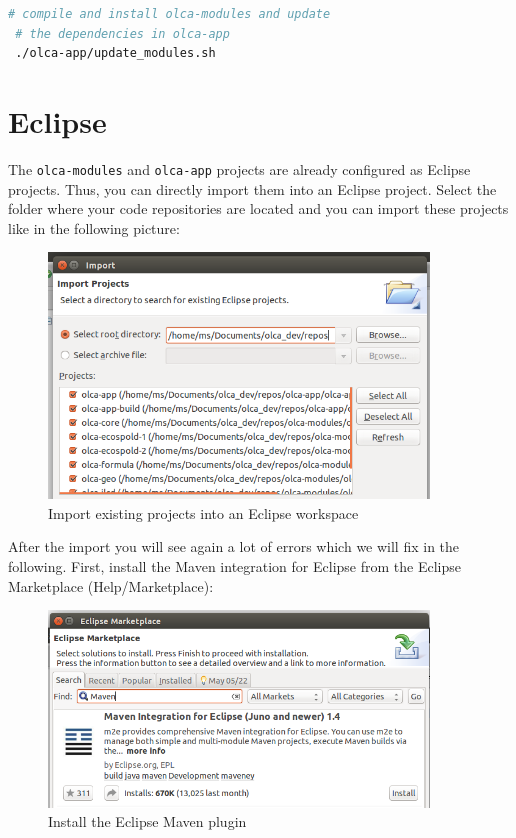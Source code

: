 \documentclass{scrreprt}
\begin{document}
\begin{lstlisting}[language=bash]
 # compile and install olca-modules and update 
 # the dependencies in olca-app
 ./olca-app/update_modules.sh
\end{lstlisting}	   

\section{Eclipse}
The \texttt{olca-modules} and \texttt{olca-app} projects are already configured as Eclipse projects. Thus, you can directly import them into an Eclipse project. Select the folder where your code repositories are located and you can import these projects like in the following picture:

\begin{figure}[H]
\centering
\includegraphics[width=0.9\textwidth]{images/eclipse_import_projects.png}
\caption{Import existing projects into an Eclipse workspace}
\end{figure} 

After the import you will see again a lot of errors which we will fix in the following. First, install the Maven integration for Eclipse from the Eclipse Marketplace (Help/Marketplace): 

\begin{figure}[H]
\centering
\includegraphics[width=0.9\textwidth]{images/eclipse_maven_integration.png}
\caption{Install the Eclipse Maven plugin}
\end{figure}  
\end{document}
